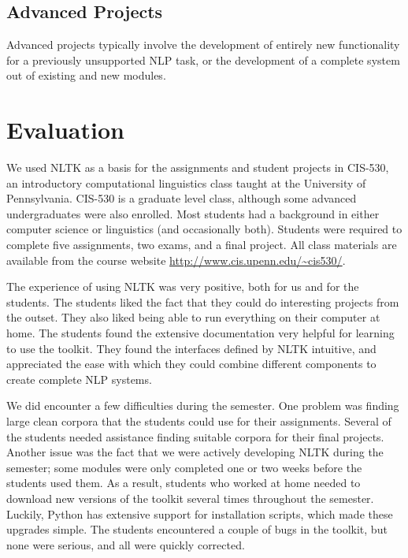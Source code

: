 \documentclass[11pt]{article}
\begin{document}
\subsection{Advanced Projects}

Advanced projects typically involve the development of entirely new
functionality for a previously unsupported NLP task, or the
development of a complete system out of existing and new modules.


\section{Evaluation}
\label{sec:evaluation}

We used NLTK as a basis for the assignments and student projects in
CIS-530, an introductory computational linguistics class taught at the
University of Pennsylvania.  CIS-530 is a graduate level class,
although some advanced undergraduates were also enrolled.  Most
students had a background in either computer science or linguistics
(and occasionally both).  Students were required to complete five assignments,
two exams, and a final project.  All class materials are available
from the course website \mbox{\url{http://www.cis.upenn.edu/~cis530/}}.

The experience of using NLTK was very positive, both for us and for
the students.  The students liked the fact that they could do
interesting projects from the outset.  They also liked being able to
run everything on their computer at home.  The students found the
extensive documentation very helpful for learning to use the toolkit.
They found the interfaces defined by NLTK intuitive, and appreciated
the ease with which they could combine different components to create
complete NLP systems.

We did encounter a few difficulties during the semester.  One problem
was finding large clean corpora that the students could use for their
assignments.  Several of the students needed assistance finding
suitable corpora for their final projects.  Another issue was the fact
that we were actively developing NLTK during the semester; some
modules were only completed one or two weeks before the students used
them.  As a result, students who worked at home needed to download new
versions of the toolkit several times throughout the semester.
Luckily, Python has extensive support for installation scripts, which
made these upgrades simple.  The students encountered a couple
of bugs in the toolkit, but none were serious, and all were quickly
corrected.
\end{document}
